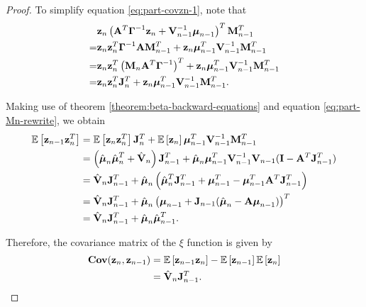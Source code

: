 \documentclass[11pt]{article}
\numberwithin{equation}{section}
\newcommand{\expectation}[1]{\mathbb{E}\left[#1\right]}
\newcommand{\z}{{\bf z}}
\begin{document}
\begin{proof}
	To simplify equation \eqref{eq:part-covzn-1}, note that
	\begin{align}
		&\z_n \left({\bf A}^T\boldsymbol\Gamma^{-1}\z_{n} + {\bf V}_{n-1}^{-1}\boldsymbol\mu_{n-1}\right)^T {\bf M}_{n-1}^T \\
		=& \z_n \z_n^T \boldsymbol{\Gamma}^{-1}{\bf A} {\bf M}_{n-1}^T + \z_n \boldsymbol{\mu}_{n-1}^T {\bf V}_{n-1}^{-1}{\bf M}_{n-1}^T\\
		=& \z_n \z_n^T \left({\bf M}_n {\bf A}^T \boldsymbol\Gamma^{-1}\right)^T + \z_n \boldsymbol{\mu}_{n-1}^T {\bf V}_{n-1}^{-1}{\bf M}_{n-1}^T\\
		=& \z_n\z_n^T {\bf J}_n^T + \z_n \boldsymbol{\mu}_{n-1}^T {\bf V}_{n-1}^{-1}{\bf M}_{n-1}^T.
	\end{align}
	
	Making use of theorem \ref{theorem:beta-backward-equations} and equation \ref{eq:part-Mn-rewrite}, we obtain
	\begin{align}
		\expectation{\z_{n-1}\z_n^T} &= \expectation{\z_n\z_n^T} {\bf J}_n^T + \expectation{\z_n}\boldsymbol{\mu}_{n-1}^T {\bf V}_{n-1}^{-1}{\bf M}_{n-1}^T\\
		&= \left(\hat{\boldsymbol{\mu}}_n\hat{\boldsymbol{\mu}}_n^T + \hat{\bf V}_n \right){\bf J}_{n-1}^T + \hat{\boldsymbol{\mu}}_n \boldsymbol{\mu}_{n-1}^T {\bf V}_{n-1}^{-1} {\bf V}_{n-1}({\bf I} - {\bf A}^T{\bf J}_{n-1}^T)\\
		&= \hat{\bf V}_n {\bf J}_{n-1}^T + \hat{\boldsymbol{\mu}}_n\left(\hat{\boldsymbol{\mu}}_n^T{\bf J}_{n-1}^T + \boldsymbol{\mu}_{n-1}^T - \boldsymbol{\mu}_{n-1}^T{\bf A}^T{\bf J}_{n-1}^T \right)\\
		&= \hat{\bf V}_n {\bf J}_{n-1}^T + \hat{\boldsymbol{\mu}}_n\left( \boldsymbol{\mu}_{n-1} + {\bf J}_{n-1} (\hat{\boldsymbol{\mu}}_n - {\bf A}\boldsymbol{\mu}_{n-1})\right)^T\\
		&= \hat{\bf V}_n {\bf J}_{n-1}^T + \hat{\boldsymbol{\mu}}_n \hat{\boldsymbol{\mu}}_{n-1}^T.
	\end{align}
	
	Therefore, the covariance matrix of the $\xi$ function is given by
	\begin{align}
		{\bf Cov}(\z_n, \z_{n-1}) &= \expectation{\z_{n-1}\z_{n}} - \expectation{\z_{n-1}}\expectation{\z_{n}}\\
		&= \hat{\bf V}_n {\bf J}_{n-1}^T.
	\end{align}
\end{proof}
\end{document}
